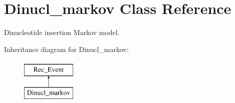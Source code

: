 \hypertarget{classDinucl__markov}{}\section{Dinucl\+\_\+markov Class Reference}
\label{classDinucl__markov}


Dinucleotide insertion Markov model.  


Inheritance diagram for Dinucl\+\_\+markov\+:\begin{figure}[H]
\begin{center}
\leavevmode
\includegraphics[height=2.000000cm]{d0/d2a/classDinucl__markov}
\end{center}
\end{figure}
